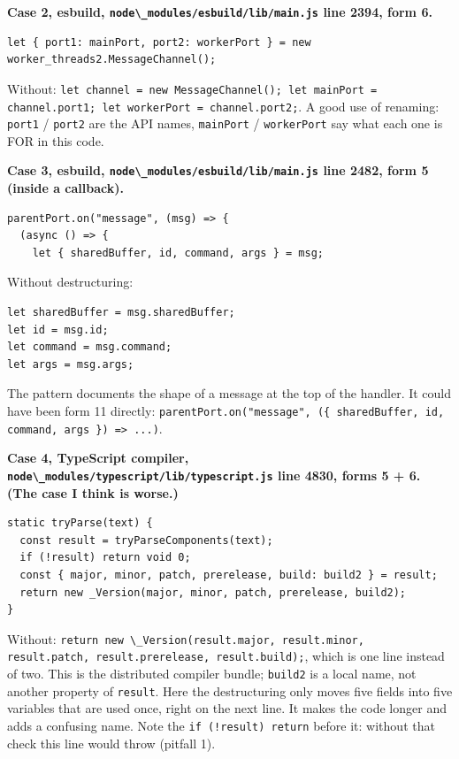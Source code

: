 \textbf{Case 2, esbuild, \passthrough{\lstinline!node\_modules/esbuild/lib/main.js!} line 2394, form 6.}

\begin{lstlisting}
let { port1: mainPort, port2: workerPort } = new worker_threads2.MessageChannel();
\end{lstlisting}

Without: \passthrough{\lstinline!let channel = new MessageChannel(); let mainPort = channel.port1; let workerPort = channel.port2;!}.
A good use of renaming: \passthrough{\lstinline!port1!} / \passthrough{\lstinline!port2!} are the API names, \passthrough{\lstinline!mainPort!} / \passthrough{\lstinline!workerPort!} say what each one is FOR in this code.

\textbf{Case 3, esbuild, \passthrough{\lstinline!node\_modules/esbuild/lib/main.js!} line 2482, form 5 (inside a callback).}

\begin{lstlisting}
parentPort.on("message", (msg) => {
  (async () => {
    let { sharedBuffer, id, command, args } = msg;
\end{lstlisting}

Without destructuring:

\begin{lstlisting}
let sharedBuffer = msg.sharedBuffer;
let id = msg.id;
let command = msg.command;
let args = msg.args;
\end{lstlisting}

The pattern documents the shape of a message at the top of the handler.
It could have been form 11 directly: \passthrough{\lstinline!parentPort.on("message", (\{ sharedBuffer, id, command, args \}) => ...)!}.

\textbf{Case 4, TypeScript compiler, \passthrough{\lstinline!node\_modules/typescript/lib/typescript.js!} line 4830, forms 5 + 6. (The case I think is worse.)}

\begin{lstlisting}
static tryParse(text) {
  const result = tryParseComponents(text);
  if (!result) return void 0;
  const { major, minor, patch, prerelease, build: build2 } = result;
  return new _Version(major, minor, patch, prerelease, build2);
}
\end{lstlisting}

Without: \passthrough{\lstinline!return new \_Version(result.major, result.minor, result.patch, result.prerelease, result.build);!}, which is one line instead of two.
This is the distributed compiler bundle; \passthrough{\lstinline!build2!} is a local name, not another property of \passthrough{\lstinline!result!}. Here the destructuring only moves five fields into five variables that are used once,
right on the next line. It makes the code longer and adds a confusing name. Note the \passthrough{\lstinline"if (!result) return"} before it: without that check
this line would throw (pitfall 1).

